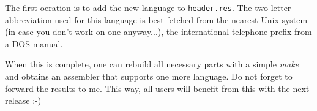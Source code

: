 \documentclass[12pt,twoside]{report}
\begin{document}
The first oeration is to add the new language to {\tt header.res}.  The
two-letter-abbreviation used for this language is best fetched from the
nearest Unix system (in case you don't work on one anyway...), the
international telephone prefix from a DOS manual.

When this is complete, one can rebuild all necessary parts with a simple
{\em make} and obtains an assembler that supports one more language.  Do
not forget to forward the results to me.  This way, all users will benefit
from this with the next release :-)


\cleardoublepage
\begin{thebibliography}{99}



\end{thebibliography}

\cleardoublepage

\printindex
\end{document}
